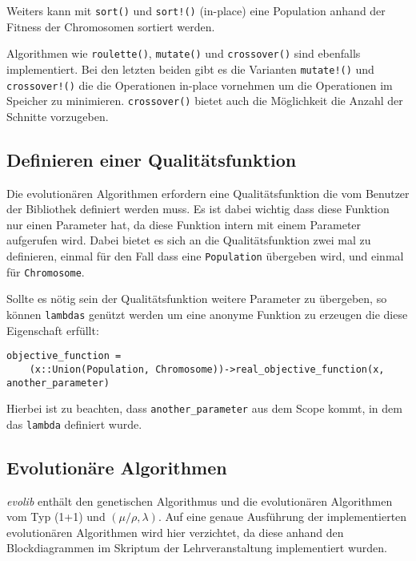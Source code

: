 Weiters kann mit \texttt{sort()} und \texttt{sort!()} (in-place) eine Population anhand der Fitness der Chromosomen sortiert werden.

Algorithmen wie \texttt{roulette()}, \texttt{mutate()} und \texttt{crossover()} sind ebenfalls implementiert. 
Bei den letzten beiden gibt es die Varianten \texttt{mutate!()} und \texttt{crossover!()} die die Operationen in-place vornehmen um die Operationen im Speicher zu minimieren. 
\texttt{crossover()} bietet auch die Möglichkeit die Anzahl der Schnitte vorzugeben.

\subsection{Definieren einer Qualitätsfunktion}
Die evolutionären Algorithmen erfordern eine Qualitätsfunktion die vom Benutzer der Bibliothek definiert werden muss. 
Es ist dabei wichtig dass diese Funktion nur einen Parameter hat, da diese Funktion intern mit einem Parameter aufgerufen wird.
Dabei bietet es sich an die Qualitätsfunktion zwei mal zu definieren, einmal für den Fall dass eine \texttt{Population} übergeben wird, und einmal für \texttt{Chromosome}. 

Sollte es nötig sein der Qualitätsfunktion weitere Parameter zu übergeben, so können \texttt{lambdas} genützt werden um eine anonyme Funktion zu erzeugen die diese Eigenschaft erfüllt:

\begin{Verbatim}
objective_function = 
    (x::Union(Population, Chromosome))->real_objective_function(x, another_parameter)
\end{Verbatim}

Hierbei ist zu beachten, dass \texttt{another\_parameter} aus dem Scope kommt, in dem das \texttt{lambda} definiert wurde.

\subsection{Evolutionäre Algorithmen}
\textit{evolib} enthält den genetischen Algorithmus und die evolutionären Algorithmen vom Typ (1+1) und $(\mu/\rho, \lambda)$.
Auf eine genaue Ausführung der implementierten evolutionären Algorithmen wird hier verzichtet, da diese anhand den Blockdiagrammen im Skriptum der Lehrveranstaltung implementiert wurden. 
